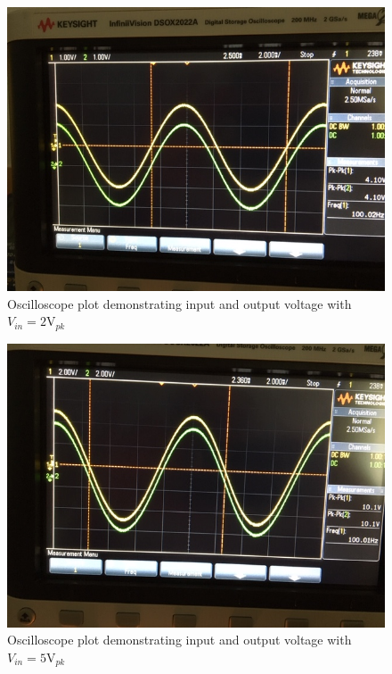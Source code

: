\documentclass{article}
\begin{document}
\begin{figure}[H]
  \centering
  \includegraphics[width=\textwidth]{image/Part3/IMG_3701.JPG}
  \caption{Oscilloscope plot demonstrating input and output voltage with $V_{in}=2\text{V}_{pk}$}
\end{figure}
\begin{figure}[H]
  \centering
  \includegraphics[width=\textwidth]{image/Part3/IMG_3702.JPG}
  \caption{Oscilloscope plot demonstrating input and output voltage with $V_{in}=5\text{V}_{pk}$}
\end{figure}
\end{document}
